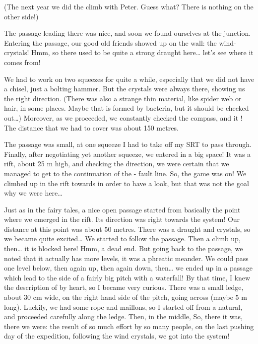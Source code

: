(The next year we did
the climb with Peter. Guess what? There is nothing on the other side!)

The passage leading there was nice, and soon we found ourselves at the
junction. Entering the passage, our good old friends showed up on the
wall: the wind-crystals! Hmm, so there used to be quite a strong draught
here\ldots{} let's see where it comes from!

We had to work on two squeezes for quite a while, especially that we did
not have a chisel, just a bolting hammer. But the crystals were always
there, showing us the right direction. (There was also a strange thin
material, like spider web or hair, in some places. Maybe that is formed
by bacteria, but it should be checked out\ldots{}) Moreover, as we
proceeded, we constantly checked the compass, and it ! The distance that we had to cover
was about 150 metres.

The passage was small, at one squeeze I had to take off my SRT to pass
through. Finally, after negotiating yet another squeeze, we entered in a
big space! It was a rift, about 25 m high, and checking the direction,
we were certain that we managed to get to the continuation of the
- fault line. So, the game was on!
We climbed up in the rift towards  in order to have a
look, but that was not the goal why we were here\ldots{}


Just as in the fairy tales, a nice open passage started from basically
the point where we emerged in the rift. Its direction was right towards
the system! Our distance at this point was about 50 metres. There was a
draught and crystals, so we became quite excited\ldots{} We started to
follow the passage. Then a climb up, then\ldots{} it is blocked here!
Hmm, a dead end. But going back to the passage, we noted that it
actually has more levels, it was a phreatic meander. We could pass one
level below, then again up, then again down, then\ldots{} we ended up in
a passage which lead to the side of a fairly big pitch with a
waterfall! By that time, I knew the description of  by
heart, so I became very curious. There was a small ledge, about 30 cm
wide, on the right hand side of the pitch, going across (maybe 5 m
long). Luckily, we had some rope and maillons, so I started off from a
natural, and proceeded carefully along the ledge. Then, in the middle,
 So, there it
was, there we were: the result of so much effort by so many people, on
the last pushing day of the expedition, following the wind crystals, we
got into the system!

